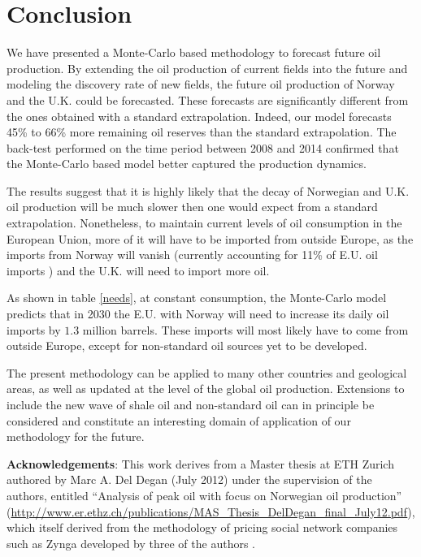 \documentclass[review]{elsarticle}
\begin{document}
\section{Conclusion}

We have presented a Monte-Carlo based methodology to forecast future
oil production. By extending the oil production of current fields
into the future and modeling the discovery rate of new fields, the
future oil production of Norway and the U.K. could be forecasted.
These forecasts are significantly different from the ones obtained
with a standard extrapolation. Indeed, our model forecasts 45\% to
66\% more remaining oil reserves than the standard extrapolation.
The back-test performed on the time period between 2008 and 2014 confirmed
that the Monte-Carlo based model better captured the production dynamics.

The results suggest that it is highly likely that the decay
of Norwegian and U.K. oil production will be much slower then one
would expect from a standard extrapolation. Nonetheless, to maintain
current levels of oil consumption in the European Union, more of it
will have to be imported from outside Europe, as the imports from
Norway will vanish (currently accounting for 11\% of E.U. oil imports
) and the U.K. will need to import more
oil.

As shown in table \ref{needs}, at constant consumption, the Monte-Carlo
model predicts that in 2030 the E.U. with Norway will need to increase
its daily oil imports by $1.3$ million barrels. These imports will most
likely have to come from outside Europe, except for  
non-standard oil sources yet to be developed.


The present methodology can be applied to many other countries
and geological areas, as well as updated at the level of the global
oil production. Extensions to include the new wave of shale oil and
non-standard oil can in principle be considered and constitute
an interesting domain of application of our methodology for the future.


\vskip 0.5cm
\noindent
{\bf Acknowledgements}: This work derives from a Master thesis at ETH Zurich authored by 
Marc A. Del Degan (July 2012) under the supervision of the authors, 
entitled ``Analysis of peak oil with focus on Norwegian oil production''
(\url{http://www.er.ethz.ch/publications/MAS_Thesis_DelDegan_final_July12.pdf}), which
itself derived from the methodology of pricing social network companies such as Zynga developed
by three of the authors \cite{Forro2012}.
\end{document}
